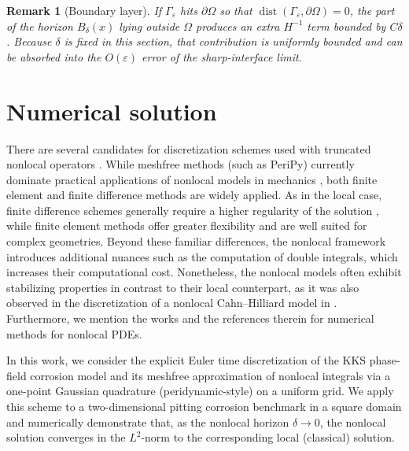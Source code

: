\documentclass[]{article}
\newtheorem{remark}{Remark}[section]
\begin{document}
\begin{remark}[Boundary layer]\label{rem:boundary-layer}
	If \(\Gamma_\varepsilon\) hits \(\partial\Omega\) so that
	\(\operatorname{dist}(\Gamma_\varepsilon,\partial\Omega)=0\), the part of
	the horizon \(B_\delta(x)\) lying outside \(\Omega\) produces an extra
	\(H^{-1}\) term bounded by \(C\delta\).  Because \(\delta\) is fixed in
	this section, that contribution is uniformly bounded and can be absorbed
	into the \(O(\varepsilon)\) error of the sharp-interface limit.
\end{remark}



\section{Numerical solution}\label{sec:discretization_and_experiments}

There are several candidates for discretization schemes used with truncated nonlocal operators \cite{delia2020numerical}. While meshfree methods (such as PeriPy) currently dominate practical applications of nonlocal models in mechanics \cite{boys2021peripy,parks2011peridynamics}, both finite element and finite difference methods are widely applied.
As in the local case, finite difference schemes generally require a higher regularity of the solution \cite{tian2013analysis}, while finite element methods offer greater flexibility and are well suited for complex geometries. Beyond these familiar differences, the nonlocal framework introduces additional nuances such as the computation of double integrals, which increases their computational cost. Nonetheless, the nonlocal models often exhibit stabilizing properties in contrast to their local counterpart, as it was also observed in the discretization of a nonlocal Cahn--Hilliard model in \cite{brunk2024analysis}. Furthermore, we mention the works \cite{martowicz2019solving,zhu2025numerical} and the references therein for numerical methods for nonlocal PDEs.

In this work, we consider the explicit Euler time discretization of the KKS phase-field corrosion model and its meshfree approximation of nonlocal integrals via a one-point Gaussian quadrature (peridynamic-style) on a uniform grid. We apply this scheme to a two-dimensional pitting corrosion benchmark in a square domain and numerically demonstrate that, as the nonlocal horizon $\delta\to0$, the nonlocal solution converges in the $L^{2}$-norm to the corresponding local (classical) solution.  
\end{document}
